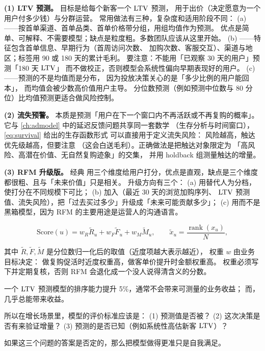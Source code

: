 \textbf{(1) LTV 预测。} 目标是给每个新客一个 $\operatorname{LTV}$ 预测，
用于出价（决定愿意为一个用户付多少钱）与分群运营。
常用做法有三种，复杂度和适用阶段不同：
(a) ——按首单渠道、首单品类、首单价格带分组，用组均值作为预测。
优点是简单、可解释、不需要模型；缺点是粒度粗。多数团队应该从这里开始。
(b) ——特征包含首单信息、早期行为（首周访问次数、
加购次数、客服交互）、渠道与地区；标签用 90 或 180 天的累计毛利。
要注意：不能用「已观察 30 天的用户」预测「180 天 $\operatorname{LTV}$」
而不做校正，否则模型会系统性偏向早期表现好的用户。
(c) ——预测的不是均值而是分布，
因为投放决策关心的是「多少比例的用户能回本」，
而均值会被少数高价值用户主导。
分位数预测（例如预测中位数与 80 分位）比均值预测更适合做风险控制。

\textbf{(2) 流失预警。} 本质是预测「用户在下一个窗口内不再活跃或不再复购的概率」。
它与 \cref{ch:admodel} 中的延迟反馈问题共享同一套数学
（生存分析与时间窗口），\cref{eq:survival} 给出的生存函数形式
可以直接用于定义流失风险：
风险越高，触达优先级越高，但要注意
（这会白送毛利）。正确做法是把触达对象限定为
「高风险、高潜在价值、无自然复购迹象」的交集，
并用 holdback 组测量触达的增量。

\textbf{(3) RFM 升级版。} 经典 
用三个维度给用户打分，优点是直观，缺点是三个维度都很粗、且与「未来价值」只是相关。
升级方向有三个：
(a) 用替代人为分档，使打分在不同规模下可比；
(b) 加入（最近 30 天的浏览加购序列、
$\operatorname{LTV}$ 预测值、流失风险），把「过去买过多少」升级成「未来可能贡献多少」；
(c) 用而不是黑箱模型，因为 RFM 的主要用途是运营人的沟通语言。

\begin{equation}
\text{Score}(u) = w_R \tilde R_u + w_F \tilde F_u + w_M \tilde M_u ,
\qquad
\tilde x_u = \frac{\operatorname{rank}(x_u)}{N} ,
\label{eq:growth-rfm}
\end{equation}

其中 $\tilde R, \tilde F, \tilde M$ 是分位数归一化后的取值（近度项越大表示越近），
权重 $w$ 由业务目标决定：
做复购促活时近度权重高，做客单价提升时金额权重高。
权重必须写下并定期复核，否则 RFM 会退化成一个没人说得清含义的分数。

\begin{insight}[预测模型在增长里的真正门槛不是准确率]
一个 $\operatorname{LTV}$ 预测模型的排序能力提升 5\%，通常不会带来可测量的业务收益；
而，几乎总能带来收益。

所以在增长场景里，模型的评价标准应该是：
(1) 预测值是否被？
(2) 这次决策是否有来验证增量？
(3) 预测的是否已知（例如系统性高估新客 $\operatorname{LTV}$）？

如果这三个问题的答案是否定的，那么把模型做得更准只是自我满足。
\end{insight}

